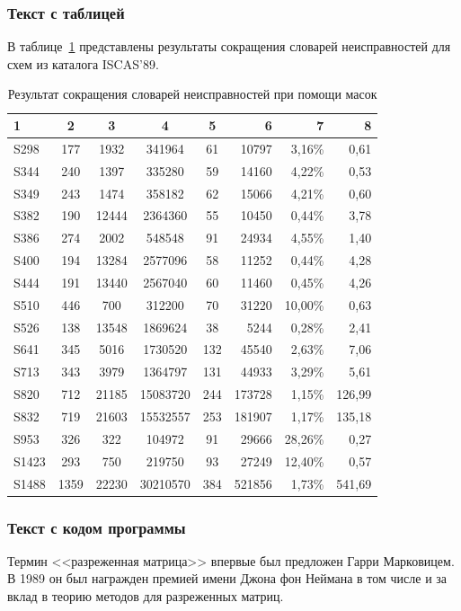 \documentclass[bachelor, och, coursework, times]{SCWorks}
\begin{document}
\subsubsection{Текст с таблицей}
В таблице~\ref{table-1} представлены результаты сокращения словарей неисправностей для схем из каталога ISCAS'89.

\begin{table}[!ht]
	\small
	\caption{Результат сокращения словарей неисправностей при помощи масок} \label{table-1}
	\begin{tabular}{|l|c|c|c|c|r|r|r|}
		\hline 1 & 2& 3& 4& 5& 6& 7& 8\\
		\hline S298 & 177 & 1932 & 341964 & 61 & 10797 & 3,16\% & 0,61\\
		\hline S344 & 240 & 1397 & 335280 & 59 & 14160 & 4,22\% & 0,53\\
		\hline S349 & 243 & 1474 & 358182 & 62 & 15066 & 4,21\% & 0,60\\
		\hline S382 & 190 & 12444 & 2364360 & 55 & 10450 & 0,44\% & 3,78\\
		\hline S386 & 274 & 2002 & 548548 & 91 & 24934 & 4,55\% & 1,40\\
		\hline S400 & 194 & 13284 & 2577096 & 58 & 11252 & 0,44\% & 4,28\\
		\hline S444 & 191 & 13440 & 2567040 & 60 & 11460 & 0,45\% & 4,26\\
		\hline S510 & 446 & 700 & 312200 & 70 & 31220 & 10,00\% & 0,63\\
		\hline S526 & 138 & 13548 & 1869624 & 38 & 5244 & 0,28\% & 2,41\\
		\hline S641 & 345 & 5016 & 1730520 & 132 & 45540 & 2,63\% & 7,06\\
		\hline S713 & 343 & 3979 & 1364797 & 131 & 44933 & 3,29\% & 5,61\\
		\hline S820 & 712 & 21185 & 15083720 & 244 & 173728 & 1,15\% & 126,99\\
		\hline S832 & 719 & 21603 & 15532557 & 253 & 181907 & 1,17\% & 135,18\\
		\hline S953 & 326 & 322 & 104972 & 91 & 29666 & 28,26\% & 0,27\\
		\hline S1423 & 293 & 750 & 219750 & 93 & 27249 & 12,40\% & 0,57\\
		\hline S1488 & 1359 & 22230 & 30210570 & 384 & 521856 & 1,73\% & 541,69\\
		\hline
	\end{tabular}
\end{table}

\subsubsection{Текст с кодом программы}
Термин <<разреженная матрица>> впервые был предложен Гарри Марковицем. В 1989 он был награжден премией имени Джона фон Неймана в том числе и за вклад в теорию методов для разреженных матриц.
\end{document}
